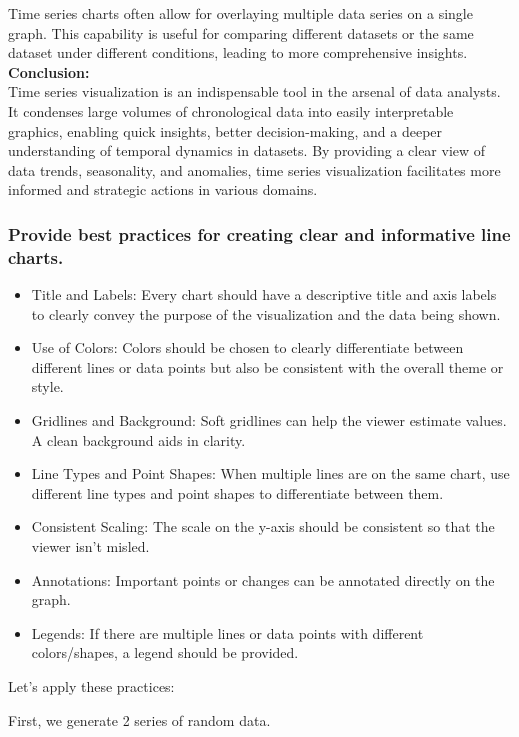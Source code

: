 \documentclass{article}\usepackage[]{graphicx}\usepackage[]{xcolor}
\begin{document}
Time series charts often allow for overlaying multiple data series on a single graph. This capability is useful for comparing different datasets or the same dataset under different conditions, leading to more comprehensive insights.\\
\textbf{Conclusion:}\\
Time series visualization is an indispensable tool in the arsenal of data analysts. It condenses large volumes of chronological data into easily interpretable graphics, enabling quick insights, better decision-making, and a deeper understanding of temporal dynamics in datasets. By providing a clear view of data trends, seasonality, and anomalies, time series visualization facilitates more informed and strategic actions in various domains.


\subsubsection{Provide best practices for creating clear and informative line charts.}

\begin{itemize}
  \item Title and Labels: Every chart should have a descriptive title and axis labels to clearly convey the purpose of the visualization and the data being shown.
  \item Use of Colors: Colors should be chosen to clearly differentiate between different lines or data points but also be consistent with the overall theme or style.
  \item Gridlines and Background: Soft gridlines can help the viewer estimate values. A clean background aids in clarity.
  \item Line Types and Point Shapes: When multiple lines are on the same chart, use different line types and point shapes to differentiate between them.
  \item Consistent Scaling: The scale on the y-axis should be consistent so that the viewer isn't misled.
  \item Annotations: Important points or changes can be annotated directly on the graph.
  \item Legends: If there are multiple lines or data points with different colors/shapes, a legend should be provided.
\end{itemize}

Let's apply these practices:


First, we generate 2 series of random data.
\end{document}
